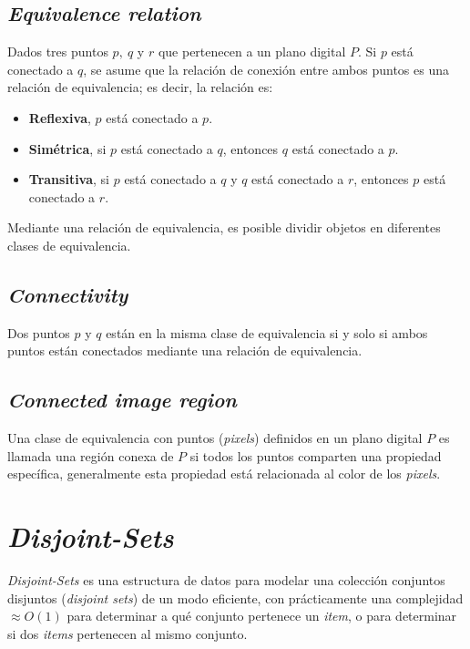 \subsection{\textit{Equivalence relation}}
Dados tres puntos $p,~q$ y $r$ que pertenecen a un plano digital $P$. Si $p$
está conectado a $q$, se asume que la relación de conexión entre ambos puntos
es una relación de equivalencia\cite{Biswas:2010:IsoCovers}; es decir, la 
relación es:
\begin{itemize}
  \item \textbf{Reflexiva}, $p$ está conectado a $p$.
  \item \textbf{Simétrica}, si $p$ está conectado a $q$, entonces $q$ está 
  conectado a $p$.
  \item \textbf{Transitiva}, si $p$ está conectado a $q$ y $q$ está conectado 
  a $r$, entonces $p$ está conectado a $r$.
\end{itemize}

Mediante una relación de equivalencia, es posible dividir objetos en
diferentes clases de equivalencia.

\subsection{\textit{Connectivity}}
Dos puntos $p$ y $q$ están en la misma clase de equivalencia si y solo si
ambos puntos están conectados mediante una relación de equivalencia.

\subsection{\textit{Connected image region}}
Una clase de equivalencia con puntos (\textit{pixels}) definidos en un plano
digital $P$ es llamada una región conexa de $P$ si todos los puntos comparten 
una propiedad específica, generalmente esta propiedad está relacionada al
color de los \textit{pixels}. 

\section{\textit{Disjoint-Sets}}
\label{sec:disjoint-sets}
\textit{Disjoint-Sets} es una estructura de datos para modelar una colección
conjuntos disjuntos (\textit{disjoint sets}) de un modo eficiente, con
prácticamente una complejidad $\approx O(1)$ para determinar a qué conjunto 
pertenece un \textit{item}, o para determinar si dos \textit{items} pertenecen
al mismo conjunto.

